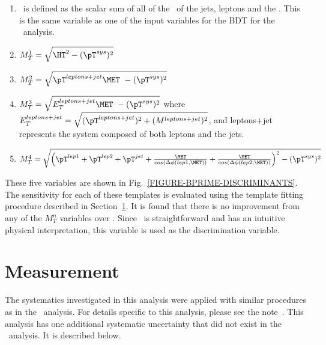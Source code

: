 \begin{enumerate}
\item \HT\ is defined as the scalar sum of all of the \pT\ of the jets, leptons and the \MET. This is the same variable as one of the input variables for the BDT for the \Wtchan\ analysis.
\item $M_{T}^1 = \sqrt{\HT^2-(\pT^{sys})^2}$
\item $M_{T}^2 = \sqrt{  \pT^{leptons+jet}\MET\   -  (\pT^{sys})^2 }$
\item $M_{T}^3 = \sqrt{  E_{T}^{leptons+jet}\MET\   -  (\pT^{sys})^2}$ \newline where $E_{T}^{leptons+jet} = \sqrt{ (\pT^{leptons+jet})^2+(M^{leptons+jet})^2 }$, and leptons+jet represents the system composed of both leptons and the jets.
\item $M_{T}^4 = \sqrt{ \left(\pT^{lep1}+\pT^{lep2}+\pT^{jet}+\frac{\MET}{cos(\Delta\phi(lep1,\MET))} +  \frac{\MET}{cos(\Delta\phi(lep2,\MET))}\right)^2-(\pT^{sys})^2}$
\end{enumerate}

These five variables are shown in Fig.~\ref{FIGURE-BPRIME-DISCRIMINANTS}. The sensitivity for each of these templates is evaluated using the template fitting procedure described in Section~\ref{SECTION-BPRIME-MEASUREMENT}. It is found that there is no improvement from any of the $M_T^n$ variables over \HT. Since \HT\ is straightforward and has an intuitive physical interpretation, this variable is used as the discrimination variable.
\section{Measurement}
\label{SECTION-BPRIME-MEASUREMENT}
The systematics investigated in this analysis were applied with similar procedures as in the \Wtchan\ analysis. For details specific to this analysis, please see the note~\cite{BPRIMEINT}. This analysis has one additional systematic uncertainty that did not exist in the \Wtchan\ analysis. It is described below.\\

{}

